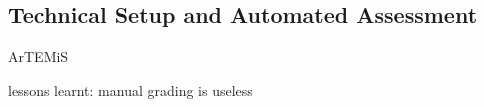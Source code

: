 \subsection{Technical Setup and Automated Assessment}
ArTEMiS \citep{artemis}

lessons learnt: manual grading is useless
